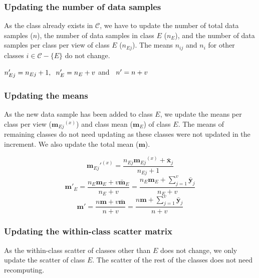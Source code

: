 \subsubsection{Updating the number of data samples}
\label{ssubs:MvIDA_SeqEC_n}
As the class already exists in $\mathcal{C}$, we have to update the number of total data samples ($n$), the number of data samples in class $E$ ($n_{E}$), and the number of data samples per class per view of class $E$ ($n_{Ej}$). The means $n_{ij}$ and $n_i$ for other classes $i \in \mathcal{C}-\{E\}$ do not change.

\begin{center}
$n'_{Ej} = n_{Ej}+1, \hspace{0.2cm} n'_E = n_E+v$ and $\hspace{0.2cm} n' = n+v$
\end{center}



\subsubsection{Updating the means}
\label{ssubs:MvIDA_SeqEC_mu}
As the new data sample has been added to class $E$, we update the means per class per view (${\textbf{m}_{Ej}}^{(x)}$) and class mean ($\textbf{m}_{E}$) of class $E$. The means of remaining classes do not need updating as these classes were not updated in the increment. We also update the total mean ($\textbf{m}$).

\begin{equation}
\label{eqn:1muij}
{\textbf{m}_{Ej}'}^{(x)} = \frac{ n_{Ej} {\textbf{m}_{Ej}}^{(x)} + \bar{\textbf{x}}_{j}}{n_{Ej}+1}
\end{equation}
\begin{equation}
\label{eqn:1mui}
\textbf{m}'_{E} = \frac{n_E \textbf{m}_{E} + v\bar{\textbf{m}}_{E}}{n_E + v} = \frac{n_E \textbf{m}_{E} + \sum_{j=1}^{v} \bar{\textbf{y}}_{j}}{n_E + v}
\end{equation}
\begin{equation}
\label{eqn:1mu}
\textbf{m}' = \frac{n \textbf{m} + v \bar{\textbf{m}}}{n+v} = \frac{n \textbf{m} + \sum_{j=1}^{v} \bar{\textbf{y}}_{j}}{n+v}  
\end{equation}



\subsubsection{Updating the within-class scatter matrix}
\label{ssubs:MvIDA_SeqEC_Sw}
As the within-class scatter of classes other than $E$ does not change, we only update the scatter of class $E$. The scatter of the rest of the classes does not need recomputing.

